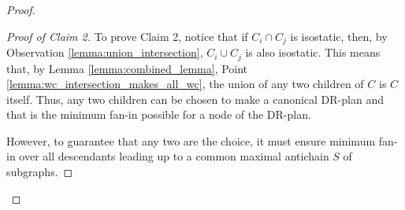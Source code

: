 \begin{proof}
\begin{proof}[Proof of Claim 2]
        To prove Claim 2, notice that if $C_i\cap C_j$ is isostatic, then, by Observation \ref{lemma:union_intersection}, $C_i\cup C_j$ is also isostatic. This means that, by Lemma \ref{lemma:combined_lemma}, Point \ref{lemma:wc_intersection_makes_all_wc}, the union of any two children of $C$ is $C$ itself. Thus, any two children can be chosen to make a canonical DR-plan and that is the minimum fan-in possible for a node of the DR-plan.


        However, to guarantee that any two are the  choice, it must ensure minimum fan-in over all descendants leading up to a common maximal antichain $S$ of subgraphs.


\end{proof}
\end{proof}
